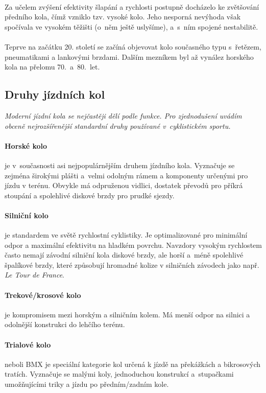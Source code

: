 \documentclass[11pt]{article}
\begin{document}
\paragraph*{} Za učelem zvýšení efektivity šlapání a rychlosti postupně docházelo ke zvětšování předního kola, čímž vzniklo tzv. vysoké kolo. Jeho nesporná nevýhoda však spočívala ve vysokém těžišti (o~něm ještě uslyšíme), a~s~ním spojené nestabilitě. \cite{kolowiki}
\paragraph*{} Teprve na začátku 20. století se začíná objevovat kolo současného typu s~řetězem, pneumatikami a lankovými brzdami. Dalším mezníkem byl až vynález horského kola na přelomu 70.~a~80.~let. \cite{kolowiki}
\subsection[Druhy kol]{Druhy jízdních kol}
\textit{Moderní jízdní kola se nejčastěji dělí podle funkce. Pro zjednodušení uvádím obceně nejrozšířenější standardní druhy používané v~cyklistickém sportu.}
\paragraph*{Horské kolo}je v~současnosti asi nejpopulárnějším druhem jízdního kola. Vyznačuje se zejména širokými plášti a~velmi odolným rámem a komponenty určenými pro jízdu v terénu. Obvykle má odpruženou vidlici, dostatek převodů pro příkrá stoupání a spolehlivé diskové brzdy pro prudké sjezdy.
\paragraph*{Silniční kolo}je standardem ve světě rychlostní cyklistiky. Je optimalizované pro minimální odpor a maximální efektivitu na hladkém povrchu. Navzdory vysokým rychlostem často nemají závodní silniční kola diskové brzdy, ale horší a~méně spolehlivé špalíkové brzdy, které způsobují hromadné kolize v silničních závodech jako např. \textit{Le Tour de France}.
\paragraph*{Trekové/krosové kolo}je kompromisem mezi horským a silničním kolem. Má menší odpor na silnici a odolnější konstrukci do lehčího terénu.
\paragraph*{Trialové kolo}neboli BMX je speciální kategorie kol určená k jízdě na překážkách a bikrosových tratích. Vyznačuje se malými koly, jednoduchou konstrukcí a~stupačkami umožňujícími triky a jízdu po předním/zadním kole.
\newpage
\end{document}
